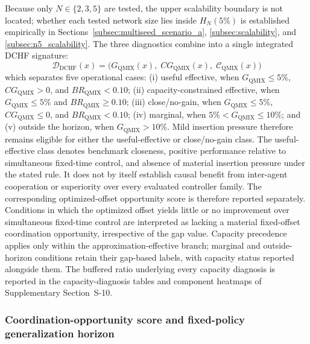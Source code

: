 \documentclass[review,12pt]{elsarticle}
\begin{document}
Because only $N\in\{2,3,5\}$ are tested, the upper scalability boundary is not located; whether each tested network size lies inside $H_N(5\%)$ is established empirically in Sections~\ref{subsec:multiseed_scenario_a}, \ref{subsec:scalability}, and \ref{subsec:n5_scalability}. The three diagnostics combine into a single integrated DCHF signature:
\begin{equation}
\boxed{\;\mathcal{D}_{\mathrm{DCHF}}(x)=
\bigl(G_{\mathrm{QMIX}}(x),\;CG_{\mathrm{QMIX}}(x),\;
\mathcal{C}_{\mathrm{QMIX}}(x)\bigr)\;}
\label{eq:integrated_dchf_diagnosis}
\end{equation}
which separates five operational cases: (i) useful effective, when $G_{\mathrm{QMIX}}\leq5\%$, $CG_{\mathrm{QMIX}}>0$, and $BR_{\mathrm{QMIX}}<0.10$; (ii) capacity-constrained effective, when $G_{\mathrm{QMIX}}\leq5\%$ and $BR_{\mathrm{QMIX}}\geq0.10$; (iii) close/no-gain, when $G_{\mathrm{QMIX}}\leq5\%$, $CG_{\mathrm{QMIX}}\leq0$, and $BR_{\mathrm{QMIX}}<0.10$; (iv) marginal, when $5\%<G_{\mathrm{QMIX}}\leq10\%$; and (v) outside the horizon, when $G_{\mathrm{QMIX}}>10\%$. Mild insertion pressure therefore remains eligible for either the useful-effective or close/no-gain class. The useful-effective class denotes benchmark closeness, positive performance relative to simultaneous fixed-time control, and absence of material insertion pressure under the stated rule. It does not by itself establish causal benefit from inter-agent cooperation or superiority over every evaluated controller family. The corresponding optimized-offset opportunity score is therefore reported separately. Conditions in which the optimized offset yields little or no improvement over simultaneous fixed-time control are interpreted as lacking a material fixed-offset coordination opportunity, irrespective of the gap value. Capacity precedence applies only within the approximation-effective branch; marginal and outside-horizon conditions retain their gap-based labels, with capacity status reported alongside them. The buffered ratio underlying every capacity diagnosis is reported in the capacity-diagnosis tables and component heatmaps of Supplementary Section~S-10.
\subsubsection{Coordination-opportunity score and fixed-policy generalization horizon}
\label{subsubsec:gen_horizon}
\end{document}
